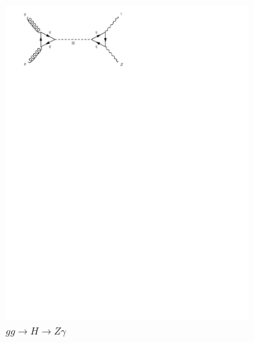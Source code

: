 \begin{figure}[h]
\begin{subfigure}[b]{0.3\textwidth}
    \includegraphics[trim={0.5cm 22cm 10cm 0cm},width=\textwidth]{../Diagrams/D17.pdf}
    \caption{$gg \rightarrow H \rightarrow Z\gamma$}
    \label{fey:17}
  \end{subfigure}%
  ~
  \begin{subfigure}[b]{0.3\textwidth}

\end{subfigure}
\end{figure}

